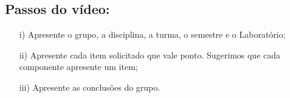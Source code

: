 \documentclass{article}
\begin{document}
\subsection*{Passos do vídeo:}
\begin{enumerate}
    \item[i)] Apresente o grupo, a disciplina, a turma, o semestre e o Laboratório;
    \item[ii)] Apresente cada item solicitado que vale ponto. Sugerimos que cada componente apresente um item;
    \item[iii)] Apresente as conclusões do grupo.
\end{enumerate}
\end{document}
